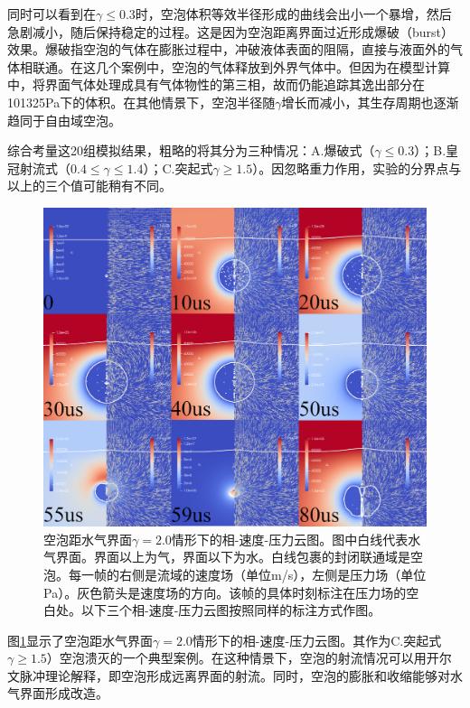同时可以看到在$\gamma\leq0.3$时，空泡体积等效半径形成的曲线会出小一个暴增，然后急剧减小，随后保持稳定的过程。这是因为空泡距离界面过近形成爆破（burst）效果。爆破指空泡的气体在膨胀过程中，冲破液体表面的阻隔，直接与液面外的气体相联通。在这几个案例中，空泡的气体释放到外界气体中。但因为在模型计算中，将界面气体处理成具有气体物性的第三相，故而仍能追踪其逸出部分在101325Pa下的体积。在其他情景下，空泡半径随$\gamma$增长而减小，其生存周期也逐渐趋同于自由域空泡。

综合考量这20组模拟结果，粗略的将其分为三种情况：A.爆破式（$\gamma\leq 0.3$）；B.皇冠射流式（$0.4\leq\gamma\leq 1.4$）；C.突起式$\gamma\geq 1.5$）。因忽略重力作用，实验的分界点与以上的三个值可能稍有不同。


\begin{figure}[h]
    \centering
    \includegraphics[width=0.9\linewidth]{img/fig3.air2.0.png}
    \caption[空泡距水气界面$\gamma=2.0$情形下的相-速度-压力云图]{空泡距水气界面$\gamma=2.0$情形下的相-速度-压力云图。图中白线代表水气界面。界面以上为气，界面以下为水。白线包裹的封闭联通域是空泡。每一帧的右侧是流域的速度场（单位m/s），左侧是压力场（单位Pa）。灰色箭头是速度场的方向。该帧的具体时刻标注在压力场的空白处。以下三个相-速度-压力云图按照同样的标注方式作图。}
    \label{fig3.air2.0pvp}
\end{figure}

图\ref{fig3.air2.0pvp}显示了空泡距水气界面$\gamma=2.0$情形下的相-速度-压力云图。其作为C.突起式$\gamma\geq 1.5$）空泡溃灭的一个典型案例。在这种情景下，空泡的射流情况可以用开尔文脉冲理论解释，即空泡形成远离界面的射流。同时，空泡的膨胀和收缩能够对水气界面形成改造。

